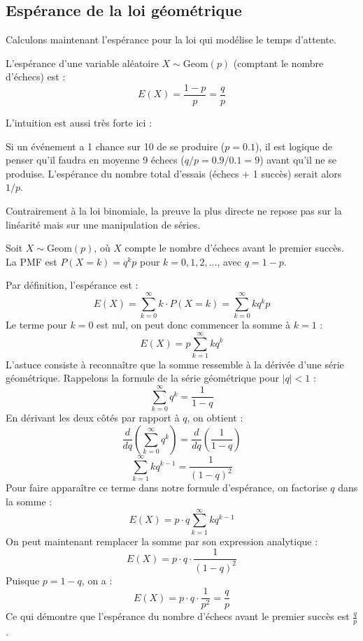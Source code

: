 \subsection{Espérance de la loi géométrique}

Calculons maintenant l'espérance pour la loi qui modélise le temps d'attente.

\begin{theorembox}
L'espérance d'une variable aléatoire $X \sim \text{Geom}(p)$ (comptant le nombre d'échecs) est :
$$E(X) = \frac{1-p}{p} = \frac{q}{p}$$
\end{theorembox}

L'intuition est aussi très forte ici :

\begin{intuitionbox}
Si un événement a 1 chance sur 10 de se produire ($p=0.1$), il est logique de penser qu'il faudra en moyenne 9 échecs ($q/p = 0.9/0.1=9$) avant qu'il ne se produise. L'espérance du nombre total d'essais (échecs + 1 succès) serait alors $1/p$.
\end{intuitionbox}

Contrairement à la loi binomiale, la preuve la plus directe ne repose pas sur la linéarité mais sur une manipulation de séries.

\begin{proofbox}
Soit $X \sim \text{Geom}(p)$, où $X$ compte le nombre d'échecs avant le premier succès. La PMF est $P(X=k) = q^k p$ pour $k=0, 1, 2, \dots$, avec $q=1-p$.

Par définition, l'espérance est :
$$E(X) = \sum_{k=0}^{\infty} k \cdot P(X=k) = \sum_{k=0}^{\infty} k q^k p$$
Le terme pour $k=0$ est nul, on peut donc commencer la somme à $k=1$ :
$$E(X) = p \sum_{k=1}^{\infty} k q^k$$
L'astuce consiste à reconnaître que la somme ressemble à la dérivée d'une série géométrique. Rappelons la formule de la série géométrique pour $|q|<1$ :
$$\sum_{k=0}^{\infty} q^k = \frac{1}{1-q}$$
En dérivant les deux côtés par rapport à $q$, on obtient :
$$\frac{d}{dq} \left( \sum_{k=0}^{\infty} q^k \right) = \frac{d}{dq} \left( \frac{1}{1-q} \right)$$
$$\sum_{k=1}^{\infty} k q^{k-1} = \frac{1}{(1-q)^2}$$
Pour faire apparaître ce terme dans notre formule d'espérance, on factorise $q$ dans la somme :
$$E(X) = p \cdot q \sum_{k=1}^{\infty} k q^{k-1}$$
On peut maintenant remplacer la somme par son expression analytique :
$$E(X) = p \cdot q \cdot \frac{1}{(1-q)^2}$$
Puisque $p = 1-q$, on a :
$$E(X) = p \cdot q \cdot \frac{1}{p^2} = \frac{q}{p}$$
Ce qui démontre que l'espérance du nombre d'échecs avant le premier succès est $\frac{q}{p}$.
\end{proofbox}

